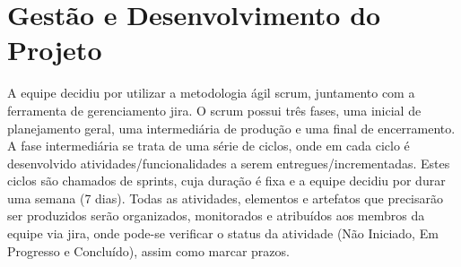 \section{Gestão e Desenvolvimento do Projeto}
A equipe decidiu por utilizar a metodologia ágil \gls{scrum}, juntamento com a ferramenta de gerenciamento \gls{jira}. O \gls{scrum} possui três fases, uma inicial de planejamento geral, uma intermediária de produção e uma final de encerramento. A fase intermediária se trata de uma série de ciclos, onde em cada ciclo é desenvolvido atividades/funcionalidades a serem entregues/incrementadas. Estes ciclos são chamados de \glspl{sprint}, cuja duração é fixa e a equipe decidiu por durar uma semana (7 dias). Todas as atividades, elementos e artefatos que precisarão ser produzidos serão organizados, monitorados e atribuídos aos membros da equipe via \gls{jira}, onde pode-se verificar o status da atividade (Não Iniciado, Em Progresso e Concluído), assim como marcar prazos.